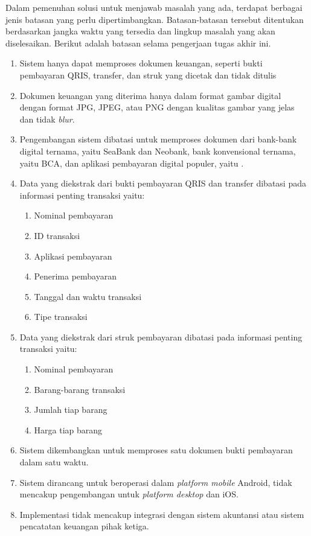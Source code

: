 Dalam pemenuhan solusi untuk menjawab masalah yang ada, terdapat berbagai jenis batasan yang perlu dipertimbangkan. Batasan-batasan tersebut ditentukan berdasarkan jangka waktu yang tersedia dan lingkup masalah yang akan diselesaikan. Berikut adalah batasan selama pengerjaan tugas akhir ini.
\begin{enumerate}
	\item Sistem hanya dapat memproses dokumen keuangan, seperti bukti pembayaran QRIS, transfer, dan struk yang dicetak dan tidak ditulis
	\item Dokumen keuangan yang diterima hanya dalam format gambar digital dengan format JPG, JPEG, atau PNG dengan kualitas gambar yang jelas dan tidak \emph{blur}.
	\item  Pengembangan sistem dibatasi untuk memproses dokumen dari bank-bank digital ternama, yaitu SeaBank dan Neobank, bank konvensional ternama, yaitu BCA, dan aplikasi pembayaran digital populer, yaitu \gopay{}.
	\item Data yang diekstrak dari bukti pembayaran QRIS dan transfer dibatasi pada informasi penting transaksi yaitu:
	      \begin{enumerate}
		      \item Nominal pembayaran
		      \item ID transaksi
		      \item Aplikasi pembayaran
		      \item Penerima pembayaran
		      \item Tanggal dan waktu transaksi
		      \item Tipe transaksi
	      \end{enumerate}
	\item Data yang diekstrak dari struk pembayaran dibatasi pada informasi penting transaksi yaitu:
	      \begin{enumerate}
		      \item Nominal pembayaran
		      \item Barang-barang transaksi
		      \item Jumlah tiap barang 
		      \item Harga tiap barang
	      \end{enumerate}
	\item Sistem dikembangkan untuk memproses satu dokumen bukti pembayaran dalam satu waktu.
	\item Sistem dirancang untuk beroperasi dalam \emph{platform mobile} Android, tidak mencakup pengembangan untuk \emph{platform desktop} dan iOS.
	\item Implementasi tidak mencakup integrasi dengan sistem akuntansi atau sistem pencatatan keuangan pihak ketiga.

\end{enumerate}
